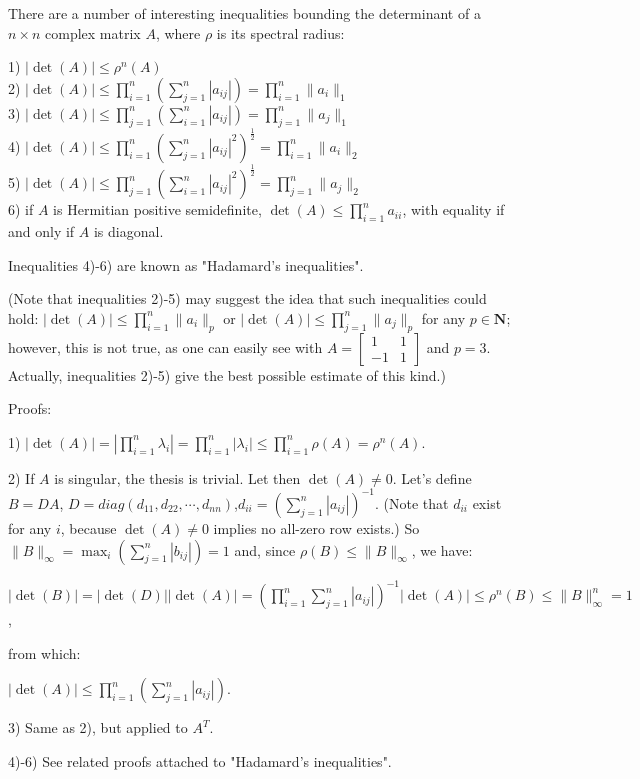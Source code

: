 \documentclass[12pt]{article}
\begin{document}
There are a number of interesting inequalities bounding the determinant of a $n\times n$ complex matrix $A$, where $\rho$ is its spectral radius:

1) $\left |\det(A)\right|\leq\rho^n(A)$\\
2) $\left |\det(A)\right|\leq\prod_{i=1}^n\left (\sum_{j=1}^n\left |a_{ij}\right |\right )=\prod_{i=1}^n \|a_i\|_1$\\
3) $\left |\det(A)\right|\leq\prod_{j=1}^n\left (\sum_{i=1}^n\left |a_{ij}\right |\right )=\prod_{j=1}^n \|a_j\|_1$\\
4) $\left |\det(A)\right|\leq\prod_{i=1}^n\left (\sum_{j=1}^n\left |a_{ij}\right |^2\right )^{\frac{1}{2}}=\prod_{i=1}^n \|a_i\|_2$\\
5) $\left |\det(A)\right|\leq\prod_{j=1}^n\left (\sum_{i=1}^n\left |a_{ij}\right |^2\right )^{\frac{1}{2}}=\prod_{j=1}^n \|a_j\|_2$\\
6) if $A$ is Hermitian positive semidefinite, $\det(A)\leq\prod_{i=1}^n a_{ii}$, with equality if and only if $A$ is diagonal.

Inequalities 4)-6) are known as "Hadamard's inequalities".

(Note that inequalities 2)-5) may suggest the idea that such inequalities could hold: $\left |\det(A)\right|\leq\prod_{i=1}^n\|a_i\|_p$ or $\left |\det(A)\right|\leq\prod_{j=1}^n\|a_j\|_p$ for any $p\in\mathbf{N}$; however, this is not true, as one can easily see with $A=\begin{bmatrix} 1 & 1\\
-1 & 1\end{bmatrix}$ and $p=3$. Actually, inequalities 2)-5) give the best possible estimate of this kind.)

Proofs:

1) $\left|\det(A)\right|=\left|\prod_{i=1}^n \lambda_i\right|=\prod_{i=1}^n\left|\lambda_i\right|\leq\prod_{i=1}^n\rho(A)=\rho^n(A).$

2) If $A$ is singular, the thesis is trivial. Let then $\det(A)\ne 0$. Let's define $B=DA$, $D=diag(d_{11},d_{22},\cdots,d_{nn})$,$d_{ii}=\left(\sum_{j=1}^n \left|a_{ij}\right|\right)^{-1}$. (Note that $d_{ii}$ exist for any $i$, because $\det(A)\ne 0$ implies no all-zero row exists.) So $\|B\|_\infty=\max_i\left(\sum_{j=1}^n \left|b_{ij}\right|\right)=1$ and, since $\rho(B)\leq\|B\|_\infty$, we have:

$\left|\det(B)\right|=\left|\det(D)\right|\left|\det(A)\right|=\left(\prod_{i=1}^n\sum_{j=1}^n\left|a_{ij}\right|\right)^{-1}\left|\det(A)\right|\leq\rho^n(B)\leq\|B\|_\infty^n =1$,

from which:

$\left|\det(A)\right|\leq\prod_{i=1}^n\left(\sum_{j=1}^n\left|a_{ij}\right |\right).$ 

3) Same as 2), but applied to $A^T$.

4)-6) See related proofs attached to "Hadamard's inequalities".
\end{document}
